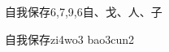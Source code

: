 \begin{entry}{自我保存}{6,7,9,6}{⾃、⼽、⼈、⼦}
  \begin{phonetics}{自我保存}{zi4wo3 bao3cun2}
  \end{phonetics}
\end{entry}
